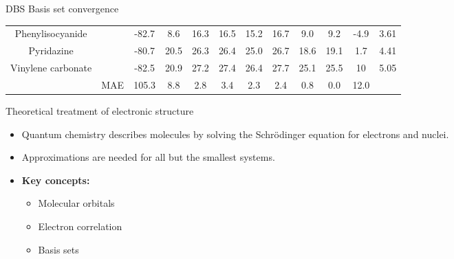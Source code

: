 \documentclass[9pt,t,xcolor=table]{beamer}
\begin{document}
\begin{frame}{\huge DBS Basis set convergence}
\begin{table}[p]
\begin{tabular}{cccccccccccc}
		Phenylisocyanide & \ce{C6H5NC} & -82.7 & 8.6 & 16.3 & 16.5 & 15.2 & 16.7 & 9.0 & 9.2 & -4.9 & 3.61 \\
		Pyridazine & \ce{C4H4N2} & -80.7 & 20.5 & 26.3 & 26.4 & 25.0 & 26.7 & 18.6 & 19.1 & 1.7 & 4.41 \\
		Vinylene carbonate & \ce{C3H2O3} & -82.5 & 20.9 & 27.2 & 27.4 & 26.4 & 27.7 & 25.1 & 25.5 & 10 & 5.05 \\
		\cmidrule(lr){2-11} 
		& MAE & 105.3 & 8.8 & 2.8 & 3.4 & 2.3 & 2.4 & 0.8 & 0.0 & 12.0 & \\
		\bottomrule
	\end{tabular}
	\end{table}
\end{frame}

\iffalse


\begin{frame}{\huge Theoretical treatment of electronic structure}\large
    \vspace{5pt}
    \begin{itemize}
        \item Quantum chemistry describes molecules by solving the Schrödinger equation for electrons and nuclei.
        \item Approximations are needed for all but the smallest systems.
        \item \textbf{Key concepts:}
        \begin{itemize}
            \item Molecular orbitals
            \item Electron correlation
            \item Basis sets
        \end{itemize}
    \end{itemize}
    \vspace{5pt}
    \centering
\end{frame}
\end{document}
